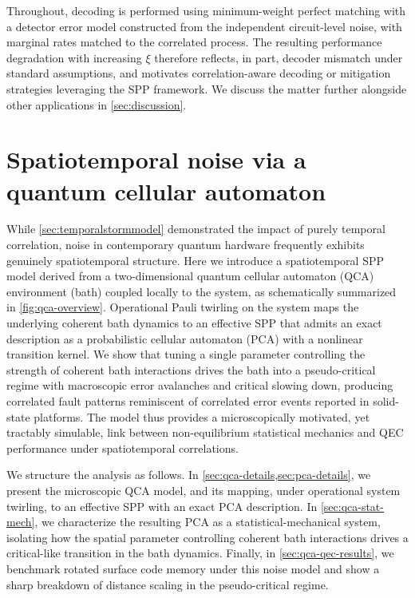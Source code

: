 \documentclass[
    aps,
    prx,
    reprint,
    superscriptaddress,
    longbibliography,
    nofootinbib,
    floatfix,
]{revtex4-2}
\begin{document}
Throughout, decoding is performed using minimum-weight perfect matching with a detector error model constructed from the independent circuit-level noise, with marginal rates matched to the correlated process. The resulting performance degradation with increasing \(\xi\) therefore reflects, in part, decoder mismatch under standard assumptions, and motivates correlation-aware decoding or mitigation strategies leveraging the SPP framework. We discuss the matter further alongside other applications in \cref{sec:discussion}.

\section{Spatiotemporal noise via a quantum cellular automaton}\label{sec:qcamodel}
While \cref{sec:temporalstormmodel} demonstrated the impact of purely temporal correlation, noise in contemporary quantum hardware frequently exhibits genuinely spatiotemporal structure. Here we introduce a spatiotemporal SPP model derived from a two-dimensional quantum cellular automaton (QCA) environment (bath) coupled locally to the system, as schematically summarized in \cref{fig:qca-overview}. Operational Pauli twirling on the system maps the underlying coherent bath dynamics to an effective SPP that admits an exact description as a probabilistic cellular automaton (PCA) with a nonlinear transition kernel. We show that tuning a single parameter controlling the strength of coherent bath interactions drives the bath into a pseudo-critical regime with macroscopic error avalanches and critical slowing down, producing correlated fault patterns reminiscent of correlated error events reported in solid-state platforms. The model thus provides a microscopically motivated, yet tractably simulable, link between non-equilibrium statistical mechanics and QEC performance under spatiotemporal correlations.

We structure the analysis as follows. In \cref{sec:qca-details,sec:pca-details}, we present the microscopic QCA model, and its mapping, under operational system twirling, to an effective SPP with an exact PCA description. In \cref{sec:qca-stat-mech}, we characterize the resulting PCA as a statistical-mechanical system, isolating how the spatial parameter controlling coherent bath interactions drives a critical-like transition in the bath dynamics. Finally, in \cref{sec:qca-qec-results}, we benchmark rotated surface code memory under this noise model and show a sharp breakdown of distance scaling in the pseudo-critical regime.
\end{document}
